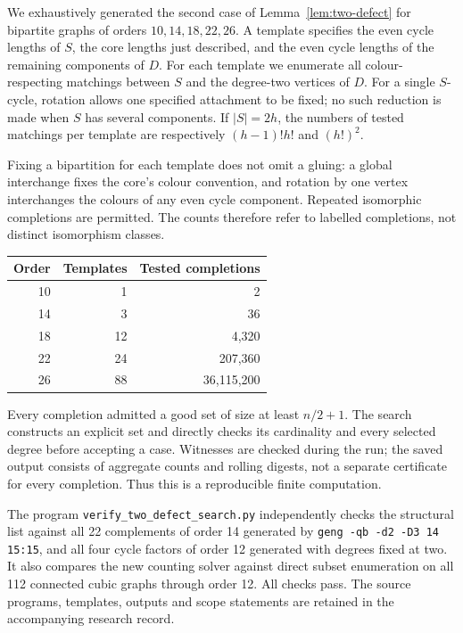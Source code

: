 \documentclass[11pt]{article}
\begin{document}
We exhaustively generated the second case of
Lemma~\ref{lem:two-defect} for bipartite graphs of orders
$10,14,18,22,26$. A template specifies the even cycle lengths
of $S$, the core lengths just described, and the even cycle
lengths of the remaining components of $D$. For each template
we enumerate all colour-respecting matchings between $S$ and
the degree-two vertices of $D$. For a single $S$-cycle, rotation
allows one specified attachment to be fixed; no such reduction
is made when $S$ has several components. If $|S|=2h$, the numbers
of tested matchings per template are respectively
$(h-1)!h!$ and $(h!)^2$.

Fixing a bipartition for each template does not omit a gluing:
a global interchange fixes the core's colour convention, and
rotation by one vertex interchanges the colours of any even
cycle component. Repeated isomorphic completions are permitted.
The counts therefore refer to labelled completions, not distinct
isomorphism classes.

\begin{center}
\begin{tabular}{rrr}
\toprule
Order & Templates & Tested completions\\
\midrule
10 & 1 & 2\\
14 & 3 & 36\\
18 & 12 & 4,320\\
22 & 24 & 207,360\\
26 & 88 & 36,115,200\\
\bottomrule
\end{tabular}
\end{center}

Every completion admitted a good set of size at least $n/2+1$.
The search constructs an explicit set and directly checks its
cardinality and every selected degree before accepting a case.
Witnesses are checked during the run; the saved output consists
of aggregate counts and rolling digests, not a separate certificate
for every completion. Thus this is a reproducible finite computation.

The program \texttt{verify\_two\_defect\_search.py} independently
checks the structural list against all 22 complements of order
14 generated by \texttt{geng -qb -d2 -D3 14 15:15}, and all four
cycle factors of order 12 generated with degrees fixed at two.
It also compares the new counting solver against direct subset
enumeration on all 112 connected cubic graphs through order 12.
All checks pass. The source programs, templates, outputs and
scope statements are retained in the accompanying research record.
\end{document}
